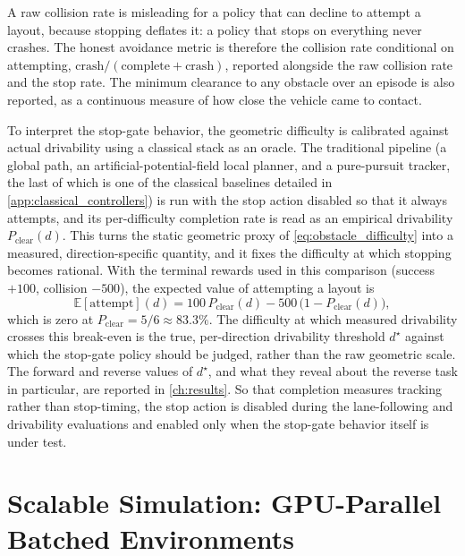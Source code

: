 A raw collision rate is misleading for a policy that can decline to attempt a layout, because stopping deflates it: a policy that stops on everything never crashes. The honest avoidance metric is therefore the collision rate conditional on attempting, $\mathrm{crash}/(\mathrm{complete}+\mathrm{crash})$, reported alongside the raw collision rate and the stop rate. The minimum clearance to any obstacle over an episode is also reported, as a continuous measure of how close the vehicle came to contact.

To interpret the stop-gate behavior, the geometric difficulty is calibrated against actual drivability using a classical stack as an oracle. The traditional pipeline (a global path, an artificial-potential-field local planner, and a pure-pursuit tracker, the last of which is one of the classical baselines detailed in \cref{app:classical_controllers}) is run with the stop action disabled so that it always attempts, and its per-difficulty completion rate is read as an empirical drivability $P_{\mathrm{clear}}(d)$. This turns the static geometric proxy of \cref{eq:obstacle_difficulty} into a measured, direction-specific quantity, and it fixes the difficulty at which stopping becomes rational. With the terminal rewards used in this comparison (success $+100$, collision $-500$), the expected value of attempting a layout is
\begin{equation}
\mathbb{E}[\mathrm{attempt}](d) = 100\,P_{\mathrm{clear}}(d) - 500\,\bigl(1 - P_{\mathrm{clear}}(d)\bigr),
\label{eq:attempt_ev}
\end{equation}
which is zero at $P_{\mathrm{clear}} = 5/6 \approx 83.3\%$. The difficulty at which measured drivability crosses this break-even is the true, per-direction drivability threshold $d^\star$ against which the stop-gate policy should be judged, rather than the raw geometric scale. The forward and reverse values of $d^\star$, and what they reveal about the reverse task in particular, are reported in \cref{ch:results}. So that completion measures tracking rather than stop-timing, the stop action is disabled during the lane-following and drivability evaluations and enabled only when the stop-gate behavior itself is under test.

\section{Scalable Simulation: GPU-Parallel Batched Environments}
\label{sec:batched_sim}

